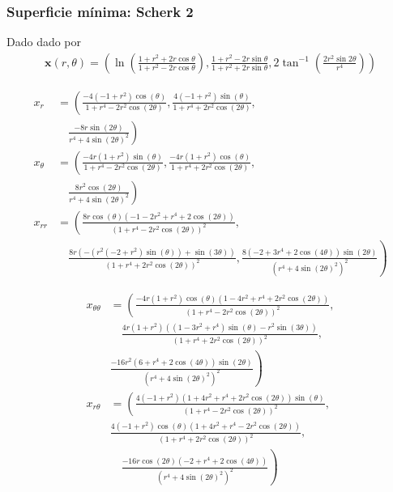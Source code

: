 \documentclass[10pt]{beamer}
\begin{document}
  \begin{frame}
    \frametitle{Superficie mínima: Scherk 2}

      Dado dado por
  $$
  \begin{aligned}
    \mathbf{x}(r,\theta)=\left( \ln \left( \frac{1+r^2+2r \cos \theta}{1+r^2-2r \cos \theta} \right), \frac{1+r^2-2r \sin\theta}{1+r^2+2r \sin \theta} , 2 \tan^{-1}\left( \frac{2 r^2 \sin 2\theta}{r^4} \right)\right)
  \end{aligned}
  $$

  \end{frame}
  \begin{frame}
    
    \begin{align*}
      x_r &= \left( \frac{-4 (-1 + r^2) \cos(\theta)}{1 + r^4 - 2 r^2 \cos(2 \theta)}, \frac{4 (-1 + r^2) \sin(\theta)}{1 + r^4 + 2 r^2 \cos(2 \theta)},\right. \\
      &\quad \left.\frac{-8 r \sin(2 \theta)}{r^4 + 4 \sin(2 \theta)^2} \right)\\
      x_\theta &= \left( \frac{-4 r (1 + r^2) \sin(\theta)}{1 + r^4 - 2 r^2 \cos(2 \theta)}, \frac{-4 r (1 + r^2) \cos(\theta)}{1 + r^4 + 2 r^2 \cos(2 \theta)},\right.\\
      &\quad\left.\frac{8 r^2 \cos(2 \theta)}{r^4 + 4 \sin(2 \theta)^2} \right)\\
      x_{rr} &= \left( \frac{8 r \cos(\theta) (-1 - 2 r^2 + r^4 + 2 \cos(2 \theta))}{(1 + r^4 - 2 r^2 \cos(2 \theta))^2},\right.\\
      &\quad \left.\frac{8 r (-(r^2 (-2 + r^2) \sin(\theta)) + \sin(3 \theta))}{(1 + r^4 + 2 r^2 \cos(2 \theta))^2}, \frac{8 (-2 + 3 r^4 + 2 \cos(4 \theta)) \sin(2 \theta)}{(r^4 + 4 \sin(2 \theta)^2)^2} \right)
    \end{align*}
  \end{frame}


  \begin{frame}
    \begin{align*}
      x_{\theta\theta} &= \left( \frac{-4 r (1 + r^2) \cos(\theta) (1 - 4 r^2 + r^4 + 2 r^2 \cos(2 \theta))}{(1 + r^4 - 2 r^2 \cos(2 \theta))^2},\right.\\
      &\quad\frac{4 r (1 + r^2) ((1 - 3 r^2 + r^4) \sin(\theta) - r^2 \sin(3 \theta))}{(1 + r^4 + 2 r^2 \cos(2 \theta))^2},\\
      &\left. \frac{-16 r^2 (6 + r^4 + 2 \cos(4 \theta)) \sin(2 \theta)}{(r^4 + 4 \sin(2 \theta)^2)^2} \right)\\
      x_{r\theta} &= \left( \frac{4 (-1 + r^2) (1 + 4 r^2 + r^4 + 2 r^2 \cos(2 \theta)) \sin(\theta)}{(1 + r^4 - 2 r^2 \cos(2 \theta))^2},\right. \\
      & \frac{4 (-1 + r^2) \cos(\theta) (1 + 4 r^2 + r^4 - 2 r^2 \cos(2 \theta))}{(1 + r^4 + 2 r^2 \cos(2 \theta))^2}, \\
      &\left.\quad \frac{-16 r \cos(2 \theta) (-2 + r^4 + 2 \cos(4 \theta))}{(r^4 + 4 \sin(2 \theta)^2)^2} \right)
    \end{align*}
    
      \end{frame}
\end{document}
